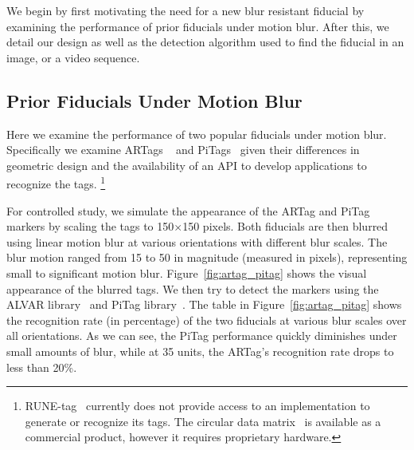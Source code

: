 \documentclass[10pt,twocolumn,letterpaper]{article}
\begin{document}
We begin by first motivating the need for a new blur resistant
fiducial by examining the performance of prior fiducials under motion
blur.  After this, we detail our design as well as the detection
algorithm used to find the fiducial in an image, or a video sequence.

\subsection{Prior Fiducials Under Motion Blur}\label{sec:blurtest}

Here we examine the performance of two popular fiducials under
motion blur.  Specifically we examine ARTags ~\cite{Fiala05} and
PiTags~\cite{Pitag13} given their differences in geometric design and
the availability of an API to develop applications to recognize the tags.
\footnote{RUNE-tag~\cite{runetag11} currently does not
provide access to an implementation to generate or recognize its tags. 
The circular data matrix~\cite{NaimarkF02} is available as a
commercial product, however it requires proprietary hardware.}

For controlled study, we simulate the appearance of the ARTag and PiTag
markers by scaling the tags to 150$\times$150 pixels.
Both fiducials are then blurred using linear motion blur at various
orientations with different  blur scales. The blur motion ranged from 15 to 50
in magnitude (measured in pixels), representing small to significant motion
blur. Figure~\ref{fig:artag_pitag} shows the visual appearance of the blurred
tags. We then try to detect the markers using the ALVAR library~\cite{alvar} and
PiTag library~\cite{ros_pitag}. The table in %
Figure~\ref{fig:artag_pitag} shows the recognition rate (in
percentage) of the two fiducials at various blur scales over all  orientations.
As we can see, the PiTag performance quickly diminishes under small amounts of
blur, while at 35 units, the ARTag's recognition rate drops to less than
20\%.
\end{document}
